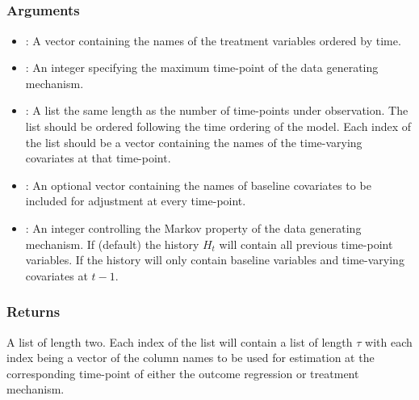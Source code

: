 \documentclass[]{jss}
\begin{document}
\subsection[create_node_list]{}

\subsubsection{Arguments}

\begin{itemize}

  \item {}: A vector containing the names of the treatment variables ordered by time.
  \item {}: An integer specifying the maximum time-point of the data generating mechanism.
  \item {}: A list the same length as the number of time-points under observation.
  The list should be ordered following the time ordering of the model.
  Each index of the list should be a vector containing the names of the time-varying covariates
  at that time-point. 
  \item {}: An optional vector containing the names of baseline covariates
  to be included for adjustment at every time-point.
  \item {}: An integer controlling the Markov property of the data generating mechanism. If 
  (default) the history \(H_t\) will contain all previous time-point variables. If  the history will
  only contain baseline variables and time-varying covariates at \(t - 1\).
  
\end{itemize}

\subsubsection{Returns}

A list of length two. Each index of the list will contain a list of length \(\tau\) with
each index being a vector of the column names to be used for estimation at the corresponding
time-point of either the outcome regression or treatment mechanism.

\renewcommand\refname{References}

\end{document}
